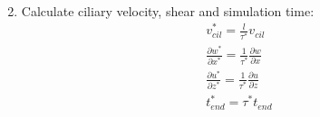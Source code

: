\documentclass[10pt,a4paper]{article}
\def\non{\nonumber}
\def\p{\partial}
\def\l{\mathit{l}}
\begin{document}
\begin{enumerate}
\begin{eqnarray}
\end{eqnarray}
\item Calculate ciliary velocity, shear and simulation time:
\begin{eqnarray}\label{nd2dpars4a}
	v^*_{cil} = \frac{\l}{\tau^*}  v_{cil} \non \\
	\frac{\p w^*}{\p x^*} = \frac{1}{\tau^*} \frac{\p w}{\p x} \non \\
	\frac{\p u^*}{\p z^*} = \frac{1}{\tau^*} \frac{\p u}{\p z} \non \\
	t^*_{end} = \tau^* t_{end}
\end{eqnarray}
	
\end{enumerate}
\end{document}
